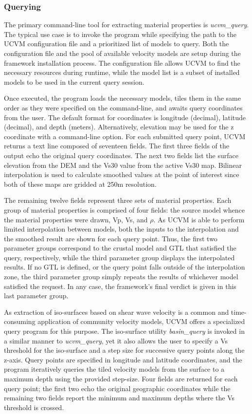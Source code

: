 \subsubsection{Querying}

The primary command-line tool for extracting material properties is \emph{ucvm\_query}. The typical use case is to invoke the program while specifying the path to the UCVM configuration file and a prioritized list of models to query. Both the configuration file and the pool of available velocity models are setup during the framework installation process. The configuration file allows UCVM to find the necessary resources during runtime, while the model list is a subset of installed models to be used in the current query session.

Once executed, the program loads the necessary models, tiles them in the same order as they were specified on the command-line, and awaits query coordinates from the user. The default format for coordinates is longitude (decimal), latitude (decimal), and depth (meters). Alternatively, elevation may be used for the z coordinate with a command-line option. For each submitted query point, UCVM returns a text line composed of seventeen fields. The first three fields of the output echo the original query coordinates. The next two fields list the surface elevation from the DEM and the Vs30 value from the active Vs30 map. Bilinear interpolation is used to calculate smoothed values at the point of interest since both of these maps are gridded at 250m resolution.

The remaining twelve fields represent three sets of material properties. Each group of material properties is comprised of four fields: the source model whence the material properties were drawn, Vp, Vs, and $\rho$. As UCVM is able to perform limited interpolation between models, both the inputs to the interpolation and the smoothed result are shown for each query point. Thus, the first two parameter groups correspond to the crustal model and GTL that satisfied the query, respectively, while the third parameter group displays the interpolated results. If no GTL is defined, or the query point falls outside of the interpolation zone, the third parameter group simply repeats the results of whichever model satisfied the request. In any case, the framework's final verdict is given in this last parameter group.

As extraction of iso-surfaces based on shear wave velocity is a common and time-consuming application of community velocity models, UCVM offers a specialized query program for this purpose. The iso-surface utility \emph{basin\_query} is invoked in a similar manner to \emph{ucvm\_query}, yet it also allows the user to specify a Vs threshold for the iso-surface and a step size for successive query points along the z-axis. Query points are specified in longitude and latitude coordinates, and the program iteratively queries the tiled velocity models from the surface to a maximum depth using the provided step-size. Four fields are returned for each query point; the first two echo the original geographic coordinates while the remaining two fields report the minimum and maximum depths where the Vs threshold is crossed.

